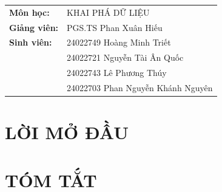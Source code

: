 \documentclass[12pt,a4paper,oneside]{report}
\begin{document}
\begin{titlepage}
\begin{center}
{\begin{tabular}{p{3.2cm} p{7.5cm}}
        \textbf{Môn học:}
        & KHAI PHÁ DỮ LIỆU\\[0.3cm]

        \textbf{Giảng viên:}
        & PGS.TS Phan Xuân Hiếu\\[0.3cm]

        \textbf{Sinh viên:}
       & 
       24022749 Hoàng Minh Triết\\[0.15cm]
        &
        24022721 Nguyễn Tài Ân Quốc\\[0.15cm]
        &
        24022743 Lê Phương Thúy\\[0.15cm]

        &
        24022703 Phan Nguyễn Khánh Nguyên

    \end{tabular}
    }

\end{center}
\end{titlepage}




\chapter*{LỜI MỞ ĐẦU}


\chapter*{TÓM TẮT}


\tableofcontents
\clearpage

\listoffigures
{}
\clearpage

\listoftables
{}
\clearpage


\end{document}
